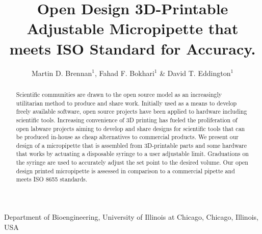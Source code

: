 \documentclass{naturegraphicx}
\title{Open Design 3D-Printable Adjustable Micropipette that meets ISO Standard for Accuracy.}
\author{Martin D. Brennan$^1$, Fahad F. Bokhari$^1$ \& David T. Eddington$^1$}
\begin{document}
\maketitle

\begin{affiliations}
 \item Department of Bioengineering, University of Illinois at Chicago, Chicago, Illinois, USA
\end{affiliations}

\begin{abstract}
Scientific communities are drawn to the open source model as an increasingly utilitarian method to produce and share work.
Initially used as a means to develop freely available software, open source projects have been applied to hardware including scientific tools.
Increasing convenience of 3D printing has fueled the proliferation of open labware projects aiming to develop and share designs for scientific tools that can be produced in-house as cheap alternatives to commercial products.
We present our design of a micropipette that is assembled from 3D-printable parts and some hardware that works by actuating a disposable syringe to a user adjustable limit.
Graduations on the syringe are used to accurately adjust the set point to the desired volume.  
Our open design printed micropipette is assessed in comparison to a commercial pipette and meets ISO 8655 standards.
\end{abstract}
\end{document}
